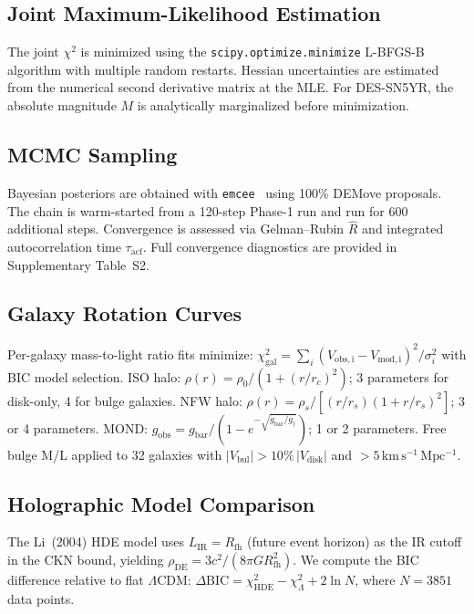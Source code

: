 \documentclass[12pt,a4paper]{article}
\newcommand{\lcdm}{$\Lambda$CDM}
\newcommand{\kms}{\,\mathrm{km\,s^{-1}\,Mpc^{-1}}}
\begin{document}
\subsection*{Joint Maximum-Likelihood Estimation}

The joint $\chi^2$ is minimized using the \texttt{scipy.optimize.minimize}
L-BFGS-B algorithm with multiple random restarts.
Hessian uncertainties are estimated from the numerical second derivative
matrix at the MLE.
For DES-SN5YR, the absolute magnitude $M$ is analytically marginalized
before minimization.

\subsection*{MCMC Sampling}

Bayesian posteriors are obtained with \texttt{emcee}~\cite{ForemanMackey2013}
using 100\% DEMove proposals.  The chain is warm-started from a 120-step
Phase-1 run and run for 600 additional steps.
Convergence is assessed via Gelman--Rubin $\hat{R}$ and integrated
autocorrelation time $\tau_\mathrm{acf}$.
Full convergence diagnostics are provided in Supplementary Table~S2.

\subsection*{Galaxy Rotation Curves}

Per-galaxy mass-to-light ratio fits minimize:
$\chi^2_\mathrm{gal} = \sum_i (V_\mathrm{obs,i} - V_\mathrm{mod,i})^2/\sigma_i^2$
with BIC model selection.
ISO halo: $\rho(r) = \rho_0/(1+(r/r_c)^2)$; 3 parameters for disk-only,
4 for bulge galaxies.
NFW halo: $\rho(r) = \rho_s/[(r/r_s)(1+r/r_s)^2]$; 3 or 4 parameters.
MOND: $g_\mathrm{obs} = g_\mathrm{bar}/(1-e^{-\sqrt{g_\mathrm{bar}/g_\dagger}})$;
1 or 2 parameters.
Free bulge M/L applied to 32 galaxies with
$|V_\mathrm{bul}| > 10\%\,|V_\mathrm{disk}|$ and $> 5\kms$.

\subsection*{Holographic Model Comparison}

The Li~(2004) HDE model uses $L_\mathrm{IR} = R_\mathrm{fh}$ (future event horizon)
as the IR cutoff in the CKN bound, yielding $\rho_\mathrm{DE} = 3c^2/(8\pi G R_\mathrm{fh}^2)$.
We compute the BIC difference relative to flat \lcdm:
$\Delta\mathrm{BIC} = \chi^2_\mathrm{HDE} - \chi^2_\Lambda + 2\ln N$,
where $N = 3851$ data points.
\end{document}
